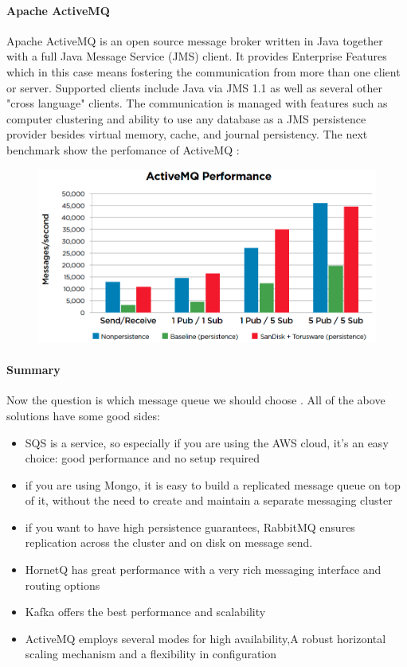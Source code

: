 \paragraph{Apache ActiveMQ}
\label{sec:sec01}
Apache ActiveMQ is an open source message broker written in Java together with a full Java Message Service (JMS) client.
It provides Enterprise Features which in this case means fostering the communication from more than one client or server.
 Supported clients include Java via JMS 1.1 as well as several other "cross language" clients. 
 The communication is managed with features such as computer clustering and ability to use any database as a 
 JMS persistence provider besides virtual memory, cache, and journal persistency.
The next benchmark show the perfomance of ActiveMQ  :
 \begin{figure}[h!]
	\centering
	\includegraphics[height=0.3\textheight]{fig01/ActiveMQ}
	\label{fig:FilialesEtClients}
\end{figure}

\paragraph{Summary}
Now the question is which message queue we should choose . All of the above solutions have some good sides:

\begin{itemize}
  \item SQS is a service, so especially if you are using the AWS cloud, it's an easy choice: good performance and no 
setup required
  \item if you are using Mongo, it is easy to build a replicated message queue on top of it, without the need to 
create and maintain a separate messaging cluster
  \item if you want to have high persistence guarantees, RabbitMQ ensures replication across the cluster and on disk
 on message send.
  \item HornetQ has great performance with a very rich messaging interface and routing options
  \item Kafka offers the best performance and scalability
  \item ActiveMQ employs several modes for high availability,A robust horizontal scaling mechanism and 
  a flexibility in configuration
\end{itemize}

